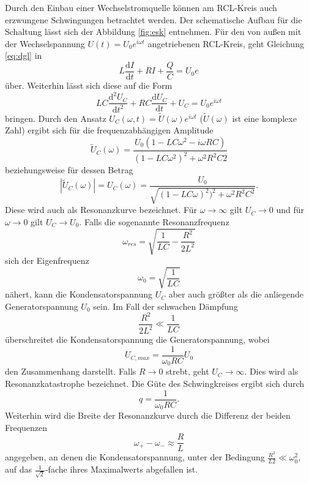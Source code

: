 Durch den Einbau einer Wechselstromquelle können am RCL-Kreis auch erzwungene Schwingungen 
betrachtet werden. Der schematische Aufbau für die Schaltung lässt sich der Abbildung \ref{fig:esk}
entnehmen. Für den von außen mit der Wechselspannung $U(t) = U_0 e^{i\omega t}$ angetriebenen 
RCL-Kreis, geht Gleichung \ref{eq:dgl} in 
\begin{equation}
    L \frac{\mathrm{d}I}{\mathrm{d}t} + RI + \frac{Q}{C} = U_0 e^{}
\end{equation}
\noindent über. Weiterhin lässt sich diese auf die Form
\begin{equation}
    LC \frac{\mathrm{d}^{2}U_C}{\mathrm{d}t^{2}} + RC \frac{\mathrm{d}U_C}{\mathrm{d}t} + U_C = U_0 e^{i\omega t}
\end{equation}
\noindent bringen. Durch den Ansatz $U_C(\omega,t) = \tilde{U}(\omega) e^{i\omega t}$ ($\tilde{U}(\omega)$ ist 
eine komplexe Zahl) ergibt sich 
für die frequenzabhängigen Amplitude 
\begin{equation}
    \tilde{U}_C(\omega) = \frac{U_0(1-LC\omega^{2}-i\omega RC)}{(1-LC \omega^{2})^{2} + \omega^{2}R^{2}C{2} }
\end{equation}
beziehungsweise für dessen Betrag
\begin{equation}
    |\tilde{U}_C(\omega)| = U_C(\omega)= \frac{U_0}{\sqrt{(1-LC\omega)^{2})^{2}+\omega^{2}R^{2}C^{2}}}.
\end{equation}
Diese wird auch als Resonanzkurve bezeichnet. Für $\omega \rightarrow \infty$ gilt
$U_C \rightarrow 0$ und für $\omega \rightarrow 0$ gilt $U_C \rightarrow U_0$. Falls die 
sogenannte Resonanzfrequenz 
\begin{equation}
    \omega_{res} = \sqrt{\frac{1}{LC} - \frac{R^{2}}{2L^{2}}}
\end{equation}
\noindent 
sich der Eigenfrequenz 
\begin{equation}
    \omega_0 = \sqrt{\frac{1}{LC}}
\end{equation}
nähert, kann die Kondensatorspannung $U_C$ aber auch größter als die anliegende Generatorspannung
$U_0$ sein. Im Fall der schwachen Dämpfung
\begin{equation*}
    \frac{R^{2}}{2L^{2}} \ll \frac{1}{LC}
\end{equation*}
\noindent 
überschreitet die Kondensatorspannung die Generatorspannung, wobei 
\begin{equation}
    U_{C,max} = \frac{1}{\omega_0 RC} U_0 
\end{equation}
\noindent
den Zusammenhang darstellt. Falls $R \rightarrow 0$ strebt, geht $U_C \rightarrow \infty$. Dies 
wird als Resonanzkatastrophe bezeichnet. Die Güte des Schwingkreises ergibt sich durch
\begin{equation}
    q = \frac{1}{\omega_0 RC}.
\end{equation}
\noindent
Weiterhin wird die Breite der Resonanzkurve durch die Differenz der beiden Frequenzen 
\begin{equation}
    \omega_+ - \omega_- \approx \frac{R}{L}
\end{equation}
angegeben, an denen die Kondensatorspannung, unter der Bedingung 
$\frac{R^{2}}{L{2}} \ll \omega_0^{2}$, auf das $\frac{1}{\sqrt{2}}$-fache
ihres Maximalwerts abgefallen ist.  

\cite{sample}
